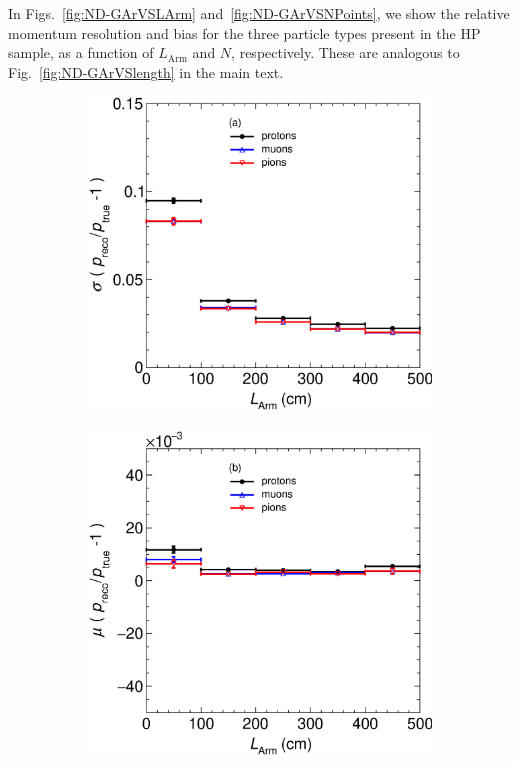 In Figs.~\ref{fig:ND-GArVSLArm} and~\ref{fig:ND-GArVSNPoints}, we show the relative momentum resolution and bias for the three particle types present in the HP sample, as a function of $L_\textrm{Arm}$ and $N$, respectively. These are analogous to Fig.~\ref{fig:ND-GArVSlength} in the main text.


\begin{figure}[!ht]
     \centering
     \begin{subfigure}[b]{0.43\textwidth}
         \centering
         \includegraphics[width=\textwidth]{figures/Appendix/RespVSLArm_XL.eps}
         \caption{}
         \label{fig:ResND-GArVSLArm}
     \end{subfigure}
     \begin{subfigure}[b]{0.43\textwidth}
         \centering
         \includegraphics[width=\textwidth]{figures/Appendix/BiaspVSLArm_XL.eps}

\end{subfigure}
\end{figure}
